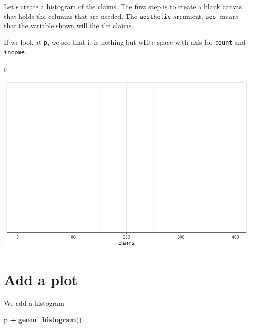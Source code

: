 \documentclass[openany]{book}
\newenvironment{Shaded}{\begin{snugshade}}{\end{snugshade}}
\newcommand{\KeywordTok}[1]{\textcolor[rgb]{0.13,0.29,0.53}{\textbf{#1}}}
\newcommand{\NormalTok}[1]{#1}
\newcommand{\OperatorTok}[1]{\textcolor[rgb]{0.81,0.36,0.00}{\textbf{#1}}}
\newcommand{\StringTok}[1]{\textcolor[rgb]{0.31,0.60,0.02}{#1}}
\begin{document}
Let's create a histogram of the claims. The first step is to create a blank canvas that holds the columns that are needed. The \texttt{aesthetic} argument, \texttt{aes}, means that the variable shown will the the claims.

\begin{Shaded}
\end{Shaded}

If we look at \texttt{p}, we see that it is nothing but white space with axis for \texttt{count} and \texttt{income}.

\begin{Shaded}
\begin{Highlighting}[]
\NormalTok{p}
\end{Highlighting}
\end{Shaded}

\includegraphics{04-visualization_files/figure-latex/unnamed-chunk-3-1.pdf}

\hypertarget{add-a-plot}{%
\section{Add a plot}\label{add-a-plot}}

We add a histogram

\begin{Shaded}
\begin{Highlighting}[]
\NormalTok{p }\OperatorTok{+}\StringTok{ }\KeywordTok{geom_histogram}\NormalTok{()}
\end{Highlighting}
\end{Shaded}
\end{document}
